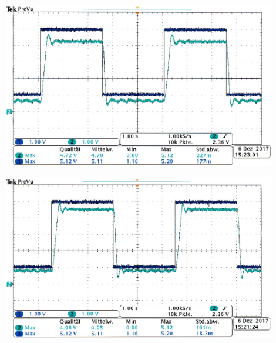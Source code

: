     \begin{center}
        \captionsetup{type=figure}
        \begin{adjustbox}{max width=\linewidth, keepaspectratio}
            \includegraphics[width=120mm]{jpg/Sinus-KP-5-Skt}
        \end{adjustbox}
        \label{fig:Sinus-KP-5-Skt}
    \end{center}
\endminipage
%
\par
%
\minipage{\linewidth}
    \begin{center}
        \captionsetup{type=figure}
        \begin{adjustbox}{max width=\linewidth, keepaspectratio}
            \includegraphics[width=120mm]{jpg/Sinus-KP-10-Skt}
        \end{adjustbox}
        \label{fig:Sinus-KP-10-Skt}
    \end{center}
\endminipage
%
\par
%
\minipage{\linewidth}
